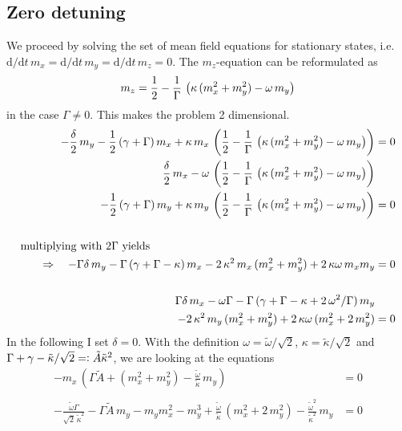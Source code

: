 \documentclass{article}
\begin{document}
\subsection{Zero detuning}
We proceed by solving the set of mean field equations for stationary states, i.e. $\text{d}/\text{d}t\,m_x=\text{d}/\text{d}t\,m_y=\text{d}/\text{d}t\,m_z=0$. The $m_z$-equation can be reformulated as
\begin{align*}
    m_z=\frac{1}{2}-\frac{1}{\Gamma}\,\left(\kappa\,(m_x^2+ m_y^2)-\omega\,m_y  \right)
\end{align*}
in the case $\Gamma\neq0$. This makes the problem 2 dimensional.
\begin{align*}
    -\frac{\delta}{2}\,m_y-\half\,(\gamma+\Gamma)\,m_x+\kappa\,m_x\,\left( \half-\frac{1}{\Gamma}\,\left(\kappa\,(m_x^2+ m_y^2)-\omega\,m_y  \right)  \right)&=0\\
    \frac{\delta}{2}\,m_x-\omega\,\left( \half-\frac{1}{\Gamma}\,\left(\kappa\,(m_x^2+ m_y^2)-\omega\,m_y  \right)  \right)&\\-\half\,(\gamma+\Gamma)\,m_y+\kappa\,m_y\,\left( \half-\frac{1}{\Gamma}\,\left(\kappa\,(m_x^2+ m_y^2)-\omega\,m_y  \right)  \right)&=0\\\\
    \text{multiplying with }2\Gamma\text{ yields}\quad\quad\quad\hspace*{6cm}&
    \\\Rightarrow\quad-\Gamma\delta\,m_y-\Gamma\,(\gamma+\Gamma-\kappa)\,m_x-2\,\kappa^2\,m_x\,( m_x^2+ m_y^2)+2\,\kappa\omega\,m_xm_y  &=0\\\\
    \Gamma\delta\,m_x-\omega\Gamma-\Gamma\,(\gamma+\Gamma-\kappa+2\,\omega^2/\Gamma)\,m_y&\\
    -2\,\kappa^2\,m_y\,( m_x^2+ m_y^2)+2\,\kappa\omega\,(m_x^2+2\,m_y^2)  &=0
\end{align*}
In the following I set $\delta=0$. With the definition $\omega=\tilde{\omega}/\sqrt{2}$, $\kappa=\tilde{\kappa}/\sqrt{2}$ and $\Gamma+\gamma-\tilde{\kappa}/\sqrt{2}=\vcentcolon \tilde{A}\tilde{\kappa}^2$, we are looking at the equations
\begin{align*}
    -m_x\,\left(\Gamma\tilde{A}+( m_x^2+ m_y^2)-\frac{\tilde{\omega}}{\tilde{\kappa}}\,m_y\right)  &=0\\\\
    -\frac{\tilde{\omega}\Gamma}{\sqrt{2}\,\tilde{\kappa}^2}-\Gamma\tilde{A}\,m_y    -m_ym_x^2- m_y^3+\frac{\tilde{\omega}}{\tilde{\kappa}}\,(m_x^2+2\,m_y^2)-\frac{\tilde{\omega}^2}{\tilde{\kappa}^2}\,m_y  &=0
\end{align*}
\end{document}
